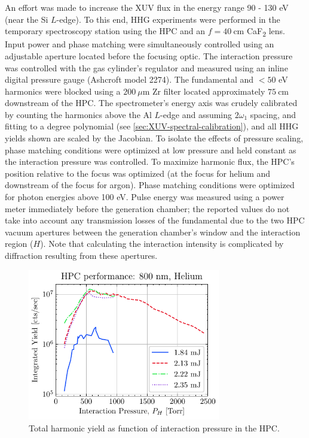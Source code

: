 An effort was made to increase the XUV flux in the energy range 90 - 130 eV (near the Si $L$-edge). To this end, HHG experiments were performed in the temporary spectroscopy station using the HPC and an $f = 40 \ \textrm{cm}$ CaF\textsubscript{2} lens. Input power and phase matching were simultaneously controlled using an adjustable aperture located before the focusing optic. The interaction pressure was controlled with the gas cylinder's regulator and measured using an inline digital pressure gauge (Ashcroft model 2274). The fundamental and $<50$ eV harmonics were blocked using a $200 \ \mu\textrm{m}$ Zr filter located approximately $75 \ \textrm{cm}$ downstream of the HPC. The spectrometer's energy axis was crudely calibrated by counting the harmonics above the Al $L$-edge and assuming $2\omega_1$ spacing, and fitting to a  degree polynomial (see \cref{sec:XUV-spectral-calibration}), and all HHG yields shown are scaled by the Jacobian. To isolate the effects of pressure scaling, phase matching conditions were optimized at low pressure and held constant as the interaction pressure was controlled. To maximize harmonic flux, the HPC's position relative to the focus was optimized (at the focus for helium and downstream of the focus for argon). Phase matching conditions were optimized for photon energies above 100 eV. Pulse energy was measured using a power meter immediately before the generation chamber; the reported values do not take into account any transmission losses of the fundamental due to the two HPC vacuum apertures between the generation chamber's window and the interaction region ($H$). Note that calculating the interaction intensity is complicated by diffraction resulting from these apertures.

\begin{figure}
	\centering
	\includegraphics[width=0.75\textwidth]{figures/chap3/HPC_P_scaling_He800.pdf}
	\caption{Total harmonic yield as function of interaction pressure in the HPC.}
	\label{fig:HPC_P_scaling_He800}
\end{figure}

